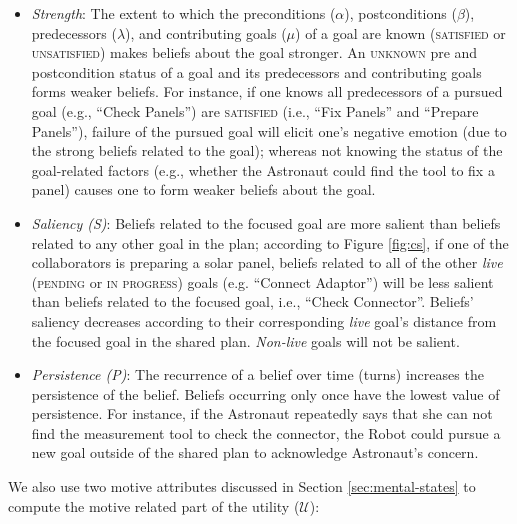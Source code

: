 \documentclass[12pt]{report}
\begin{document}
\begin{itemize}
  \setlength\itemsep{1mm}
  \item \textit{Strength}: The extent to which the preconditions ($\alpha$),
  postconditions ($\beta$), predecessors ($\lambda$), and contributing goals
  ($\mu$) of a goal are known (\textsc{satisfied} or \textsc{unsatisfied}) makes
  beliefs about the goal stronger. An \textsc{unknown} pre and postcondition
  status of a goal and its predecessors and contributing goals forms weaker
  beliefs. For instance, if one knows all predecessors of a pursued goal (e.g.,
  ``Check Panels'') are \textsc{satisfied} (i.e., ``Fix Panels'' and ``Prepare
  Panels''), failure of the pursued goal will elicit one's negative emotion (due
  to the strong beliefs related to the goal); whereas not knowing the status of
  the goal-related factors (e.g., whether the Astronaut could find the tool to
  fix a panel) causes one to form weaker beliefs about the goal.
  \item \textit{Saliency (S)}: Beliefs related to the focused goal are more
  salient than beliefs related to any other goal in the plan; according to
  Figure \ref{fig:cs}, if one of the collaborators is preparing a solar panel,
  beliefs related to all of the other \textit{live} (\textsc{pending} or
  \textsc{in progress}) goals (e.g. ``Connect Adaptor'') will be less salient
  than beliefs related to the focused goal, i.e., ``Check Connector''. Beliefs'
  saliency decreases according to their corresponding \textit{live} goal's
  distance from the focused goal in the shared plan. \textit{Non-live} goals
  will not be salient.
  \item \textit{Persistence (P)}: The recurrence of a belief over time (turns)
  increases the persistence of the belief. Beliefs occurring only once have the
  lowest value of persistence. For instance, if the Astronaut repeatedly says
  that she can not find the measurement tool to check the connector, the Robot
  could pursue a new goal outside of the shared plan to acknowledge Astronaut's
  concern.
\end{itemize}

\noindent We also use two motive attributes discussed in Section
\ref{sec:mental-states} to compute the motive related part of the utility
($\mathcal{U}$):
\end{document}

